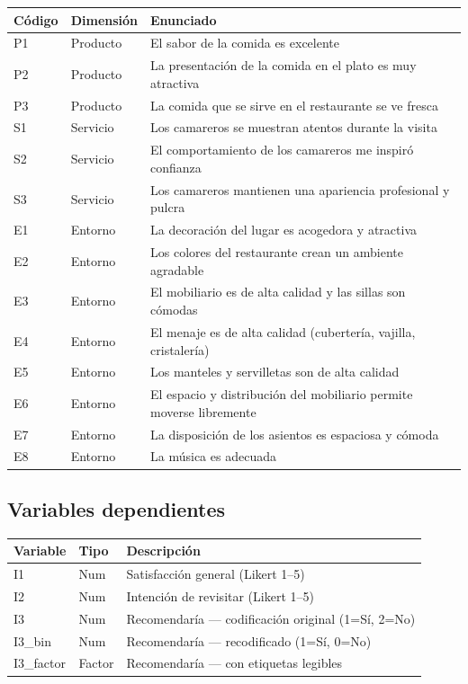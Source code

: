 \documentclass[
  spanish,
]{article}
\begin{document}
\begin{tabu} to 
\toprule
Código & Dimensión & Enunciado\\
\midrule
P1 & Producto & El sabor de la comida es excelente\\
P2 & Producto & La presentación de la comida en el plato es muy atractiva\\
P3 & Producto & La comida que se sirve en el restaurante se ve fresca\\
S1 & Servicio & Los camareros se muestran atentos durante la visita\\
S2 & Servicio & El comportamiento de los camareros me inspiró confianza\\
\addlinespace
S3 & Servicio & Los camareros mantienen una apariencia profesional y pulcra\\
E1 & Entorno & La decoración del lugar es acogedora y atractiva\\
E2 & Entorno & Los colores del restaurante crean un ambiente agradable\\
E3 & Entorno & El mobiliario es de alta calidad y las sillas son cómodas\\
E4 & Entorno & El menaje es de alta calidad (cubertería, vajilla, cristalería)\\
\addlinespace
E5 & Entorno & Los manteles y servilletas son de alta calidad\\
E6 & Entorno & El espacio y distribución del mobiliario permite moverse libremente\\
E7 & Entorno & La disposición de los asientos es espaciosa y cómoda\\
E8 & Entorno & La música es adecuada\\
\bottomrule
\end{tabu}

\subsection{Variables dependientes}\label{variables-dependientes}

\begin{table}[!h]
\centering
\begin{tabular}{ll>{\raggedright\arraybackslash}p{9cm}}
\toprule
Variable & Tipo & Descripción\\
\midrule
I1 & Num & Satisfacción general (Likert 1--5)\\
I2 & Num & Intención de revisitar (Likert 1--5)\\
I3 & Num & Recomendaría --- codificación original (1=Sí, 2=No)\\
I3\_bin & Num & Recomendaría --- recodificado (1=Sí, 0=No)\\
I3\_factor & Factor & Recomendaría --- con etiquetas legibles\\
\bottomrule
\end{tabular}
\end{table}
\end{document}
